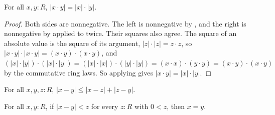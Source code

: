 \begin{lemma}
  \label{absMul}
  For all $x, y : R$, $\lvert x \cdot y \rvert = \lvert x \rvert \cdot \lvert y \rvert$.
\end{lemma}
\begin{proof}
  Both sides are nonnegative. The left is nonnegative by , and the right is nonnegative by  applied to  twice. Their squares also agree. The square of an absolute value is the square of its argument, $\lvert z \rvert \cdot \lvert z \rvert = z \cdot z$, so $\lvert x \cdot y \rvert \cdot \lvert x \cdot y \rvert = (x \cdot y) \cdot (x \cdot y)$, and $(\lvert x \rvert \cdot \lvert y \rvert) \cdot (\lvert x \rvert \cdot \lvert y \rvert) = (\lvert x \rvert \cdot \lvert x \rvert) \cdot (\lvert y \rvert \cdot \lvert y \rvert) = (x \cdot x) \cdot (y \cdot y) = (x \cdot y) \cdot (x \cdot y)$ by the commutative ring laws. So applying  gives $\lvert x \cdot y \rvert = \lvert x \rvert \cdot \lvert y \rvert$.
\end{proof}

\begin{lemma}
  \label{triangleSubLe}
  For all $x, y, z : R$, $\lvert x - y \rvert \le \lvert x - z \rvert + \lvert z - y \rvert$.
\end{lemma}

\begin{lemma}
  \label{selfSeparated}
  For all $x, y : R$, if $\lvert x - y \rvert < z$ for every $z : R$ with $0 < z$, then $x = y$.
\end{lemma}
